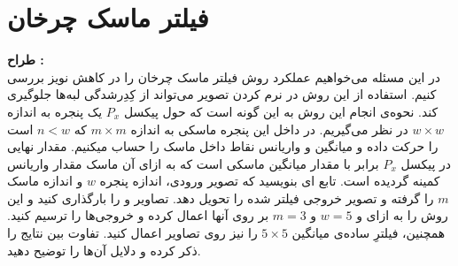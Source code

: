 \documentclass[a4paper]{article}
\begin{document}
\section{فیلتر ماسک چرخان}
\textbf{طراح :‌ }
\vspace{0.5cm}
\\
در این مسئله می‌خواهیم عملکرد روش فیلتر ماسک چرخان را در کاهش نویز بررسی کنیم. استفاده از این روش در نرم کردن تصویر می‌تواند از کِدِرشدگی لبه‌ها جلوگیری کند. نحوه‌ی انجام این روش به این گونه است که حول پیکسل $ P_{x} $ یک پنجره به اندازه $ w \times w $ در نظر می‌گیریم. در داخل این پنجره ماسکی به اندازه $ m \times m $  که $ n < w $ ‌است را حرکت داده و میانگین و واریانس نقاط داخل ماسک را حساب میکنیم.
مقدار نهایی در پیکسل $ P_{x} $  برابر با مقدار میانگین ماسکی است که به ازای آن ماسک مقدار واریانس کمینه گردیده است. تابع ای بنویسید که تصویر ورودی، اندازه پنجره $ w $ و اندازه ماسک $ m $ را گرفته و تصویر خروجی فیلتر شده را تحویل دهد.
‌تصاویر 
 و
 را بارگذاری کنید و این روش را به ازای  و
 $ w = 5 $
 و 
$   m = 3 $
 بر روی آنها اعمال کرده و خروجی‌ها را ترسیم کنید. همچنین، فیلترِ ساده‌ی میانگین
 $  5 \times 5  $
 را نیز روی تصاویر اعمال کنید. تفاوت بین نتایج را ذکر کرده و دلایل آن‌ها را توضیح دهید.
\end{document}
